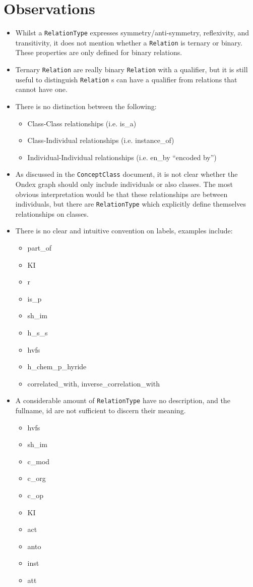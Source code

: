 \documentclass[a4paper,10pt]{article}
\newcommand{\term}[1]{\texttt{#1}\xspace}
\newcommand{\rt}{\term{RelationType}}
\newcommand{\re}{\term{Relation}}
\begin{document}
\section{Observations}
\begin{itemize}
\item Whilst a \rt expresses symmetry/anti-symmetry, reflexivity, and transitivity, it does not mention whether a \re is ternary or binary. These properties are only defined for binary relations.

\item Ternary \re are really binary \re with a qualifier, but it is still useful to distinguish \re s can have a qualifier from relations that cannot have one.

\item There is no distinction between the following:
	\begin{itemize}
		\item Class-Class relationships (i.e. is\_a)
		\item Class-Individual relationships (i.e. instance\_of)
		\item Individual-Individual relationships (i.e. en\_by ``encoded by'')
	\end{itemize}

\item As discussed in the \term{ConceptClass} document, it is not clear whether the Ondex graph should only include individuals or also classes. The most obvious interpretation would be that these relationships are between individuals, but there are \rt which explicitly define themselves relationships on classes.

\item There is no clear and intuitive convention on labels, examples include:
	\begin{itemize}
		\item part\_of
		\item KI
		\item r
		\item is\_p
		\item sh\_im
		\item h\_s\_s
		\item hvfs
		\item h\_chem\_p\_hyride
		\item correlated\_with, inverse\_correlation\_with
	\end{itemize}

\item A considerable amount of \rt have no description, and the fullname, id are not sufficient to discern their meaning.
	\begin{itemize}
		\item hvfs
		\item sh\_im
		\item c\_mod
		\item c\_org
		\item c\_op
		\item KI
		\item act
		\item anto
		\item inst
		\item att
	\end{itemize}


\end{itemize}
\end{document}
